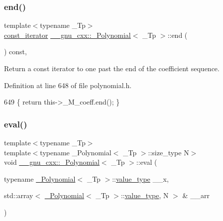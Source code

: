 \subsubsection{\texorpdfstring{end()}{end()}\hspace{0.1cm}{\footnotesize\ttfamily [2/2]}}
{\footnotesize\ttfamily template$<$typename \+\_\+\+Tp$>$ \\
\hyperlink{class____gnu__cxx_1_1__Polynomial_a96e4523cc2a834724fe4224f0800486b}{const\+\_\+iterator} \hyperlink{class____gnu__cxx_1_1__Polynomial}{\+\_\+\+\_\+gnu\+\_\+cxx\+::\+\_\+\+Polynomial}$<$ \+\_\+\+Tp $>$\+::end (\begin{DoxyParamCaption}{ }\end{DoxyParamCaption}) const\hspace{0.3cm}{\ttfamily [inline]}, {\ttfamily [noexcept]}}

Return a {\ttfamily const} iterator to one past the end of the coefficient sequence. 

Definition at line 648 of file polynomial.\+h.


\begin{DoxyCode}
649       \{ \textcolor{keywordflow}{return} this->\_M\_coeff.end(); \}
\end{DoxyCode}
\mbox{\label{class____gnu__cxx_1_1__Polynomial_a5558b16a9a4b594e506d30e5d10289b4}} 
\subsubsection{\texorpdfstring{eval()}{eval()}\hspace{0.1cm}{\footnotesize\ttfamily [1/4]}}
{\footnotesize\ttfamily template$<$typename \+\_\+\+Tp$>$ \\
template$<$typename \+\_\+\+Polynomial$<$ \+\_\+\+Tp $>$\+::size\+\_\+type N$>$ \\
void \hyperlink{class____gnu__cxx_1_1__Polynomial}{\+\_\+\+\_\+gnu\+\_\+cxx\+::\+\_\+\+Polynomial}$<$ \+\_\+\+Tp $>$\+::eval (\begin{DoxyParamCaption}\item[{typename \hyperlink{class____gnu__cxx_1_1__Polynomial}{\+\_\+\+Polynomial}$<$ \+\_\+\+Tp $>$\+::\hyperlink{class____gnu__cxx_1_1__Polynomial_a725563351f50e76084a7a016c06f8a53}{value\+\_\+type}}]{\+\_\+\+\_\+x,  }\item[{std\+::array$<$ \hyperlink{class____gnu__cxx_1_1__Polynomial}{\+\_\+\+Polynomial}$<$ \+\_\+\+Tp $>$\+::\hyperlink{class____gnu__cxx_1_1__Polynomial_a725563351f50e76084a7a016c06f8a53}{value\+\_\+type}, N $>$ \&}]{\+\_\+\+\_\+arr }\end{DoxyParamCaption})}



